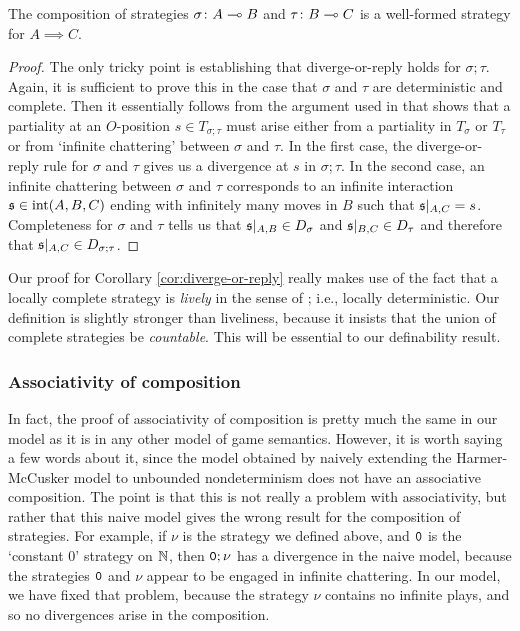\documentclass[sigplan,10pt,review]{acmart}\settopmatter{printfolios=true,printccs=false,printacmref=false}
\begin{document}
\begin{corollary}
  The composition of strategies $\sigma\colon A\multimap B$ and $\tau\colon B \multimap C$ is a well-formed strategy for $A\implies C$.
  \label{cor:diverge-or-reply}
\end{corollary}
\begin{proof}
  The only tricky point is establishing that diverge-or-reply holds for $\sigma;\tau$.  
  Again, it is sufficient to prove this in the case that $\sigma$ and $\tau$ are deterministic and complete.
  Then it essentially follows from the argument used in \cite{abramskyjagadeesangames} that shows that a partiality at an $O$-position $s\in T_{\sigma;\tau}$ must arise either from a partiality in $T_\sigma$ or $T_\tau$ or from `infinite chattering' between $\sigma$ and $\tau$.  
  In the first case, the diverge-or-reply rule for $\sigma$ and $\tau$ gives us a divergence at $s$ in $\sigma;\tau$.  
  In the second case, an infinite chattering between $\sigma$ and $\tau$ corresponds to an infinite interaction $\mathfrak s\in\operatorname{int}(A,B,C)$ ending with infinitely many moves in $B$ such that $\mathfrak s\vert_{A,C}=s$. 
  Completeness for $\sigma$ and $\tau$ tells us that $\mathfrak s\vert_{A,B}\in D_\sigma$ and $\mathfrak s\vert_{B,C}\in D_\tau$ and therefore that $\mathfrak s\vert_{A,C}\in D_{\sigma;\tau}$.  
\end{proof}

Our proof for Corollary \ref{cor:diverge-or-reply} really makes use of the fact that a locally complete strategy is \emph{lively} in the sense of \cite{LevyGsInfinite}; i.e., locally deterministic.  
Our definition is slightly stronger than liveliness, because it insists that the union of complete strategies be \emph{countable}.  
This will be essential to our definability result.

\subsubsection{Associativity of composition}

In fact, the proof of associativity of composition is pretty much the same in our model as it is in any other model of game semantics.  
However, it is worth saying a few words about it, since the model obtained by naively extending the Harmer-McCusker model to unbounded nondeterminism does not have an associative composition.  
The point is that this is not really a problem with associativity, but rather that this naive model gives the wrong result for the composition of strategies.  
For example, if $\nu$ is the strategy we defined above, and ${\mathtt{0}}$ is the `constant $0$' strategy on $\mathbb{N}$, then ${\mathtt{0}};\nu$ has a divergence in the naive model, because the strategies ${\mathtt{0}}$ and $\nu$ appear to be engaged in infinite chattering.  
In our model, we have fixed that problem, because the strategy $\nu$ contains no infinite plays, and so no divergences arise in the composition.
\end{document}
